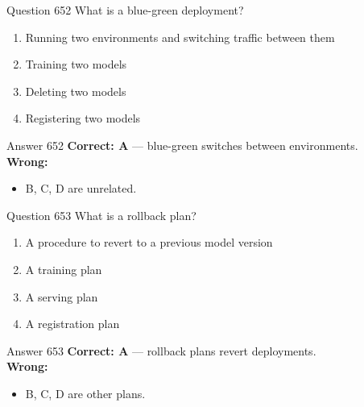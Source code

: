\documentclass[aspectratio=169,11pt]{beamer}
\begin{document}
	\begin{frame}{Question 652}
		What is a blue-green deployment?
		\begin{enumerate}[label=\Alph*.]
			\item Running two environments and switching traffic between them
			\item Training two models
			\item Deleting two models
			\item Registering two models
		\end{enumerate}
	\end{frame}
	\begin{frame}{Answer 652}
		\textbf{Correct: A} --- blue-green switches between environments.\\
		\vspace{0.5em}
		\textbf{Wrong:}
		\begin{itemize}
			\item B, C, D are unrelated.
		\end{itemize}
	\end{frame}
	
	\begin{frame}{Question 653}
		What is a rollback plan?
		\begin{enumerate}[label=\Alph*.]
			\item A procedure to revert to a previous model version
			\item A training plan
			\item A serving plan
			\item A registration plan
		\end{enumerate}
	\end{frame}
	\begin{frame}{Answer 653}
		\textbf{Correct: A} --- rollback plans revert deployments.\\
		\vspace{0.5em}
		\textbf{Wrong:}
		\begin{itemize}
			\item B, C, D are other plans.
		\end{itemize}
	\end{frame}
	
\end{document}
